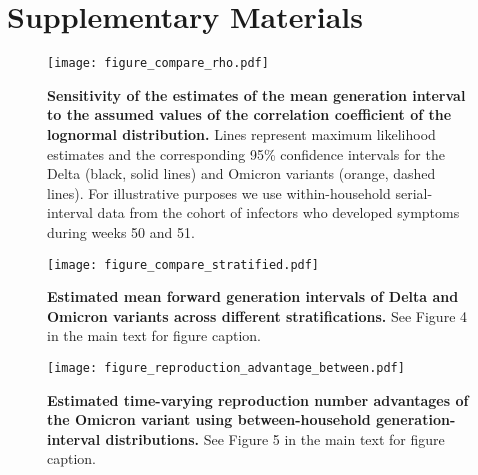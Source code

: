 \documentclass[12pt]{article}
\begin{document}
\pagebreak

\section*{Supplementary Materials}
\setcounter{figure}{0}
\renewcommand{\thefigure}{S\arabic{figure}}

\begin{figure}[!th]
\texttt{[image: figure\_compare\_rho.pdf]}
\caption{
\textbf{Sensitivity of the estimates of the mean generation interval to the assumed values of the correlation coefficient of the lognormal distribution.}
Lines represent maximum likelihood estimates and the corresponding 95\% confidence intervals for the Delta (black, solid lines) and Omicron variants (orange, dashed lines).
For illustrative purposes we use within-household serial-interval data from the cohort of infectors who developed symptoms during weeks 50 and 51.
}
\end{figure}

\pagebreak

\begin{figure}[!th]
\texttt{[image: figure\_compare\_stratified.pdf]}
\caption{
\textbf{Estimated mean forward generation intervals of Delta and Omicron variants across different stratifications.}
See Figure 4 in the main text for figure caption.
}
\end{figure}


\pagebreak

\begin{figure}[!th]
\texttt{[image: figure\_reproduction\_advantage\_between.pdf]}
\caption{
\textbf{Estimated time-varying reproduction number advantages of the Omicron variant using between-household generation-interval distributions.}
See Figure 5 in the main text for figure caption.
}
\end{figure}

\pagebreak


\end{document}
